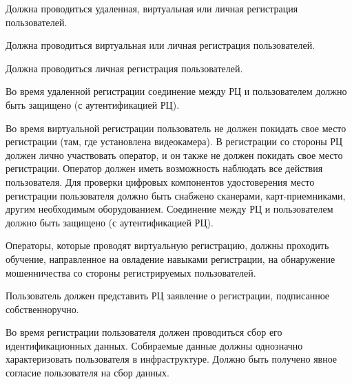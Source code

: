 


Должна проводиться удаленная, виртуальная или личная регистрация пользователей.

Должна проводиться виртуальная или личная регистрация пользователей.

Должна проводиться личная регистрация пользователей.

Во время удаленной регистрации соединение между РЦ и пользователем должно быть 
защищено (с аутентификацией РЦ).

Во время виртуальной регистрации пользователь не должен покидать свое
место регистрации (там, где установлена видеокамера). В регистрации со стороны
РЦ должен лично участвовать оператор, и он также не должен покидать свое место
регистрации.
%
Оператор должен иметь возможность наблюдать все действия пользователя.
%
Для проверки цифровых компонентов удостоверения место регистрации пользователя
должно быть снабжено сканерами, карт-приемниками, другим необходимым
оборудованием.
%
Соединение между РЦ и пользователем должно быть защищено (с аутентификацией РЦ).


Операторы, которые проводят виртуальную регистрацию, должны проходить обучение, 
направленное на овладение навыками регистрации, на обнаружение мошенничества со 
стороны регистрируемых пользователей.
%

Пользователь должен представить РЦ заявление о регистрации, подписанное 
собственноручно.


Во время регистрации пользователя должен проводиться сбор его идентификационных
данных. Собираемые данные должны однозначно характеризовать пользователя
в инфраструктуре. Должно быть получено явное согласие пользователя на сбор 
данных.

